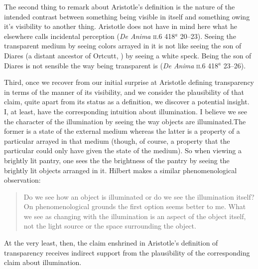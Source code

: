 \documentclass[12pt]{article}
\begin{document}
The second thing to remark about Aristotle's definition is the nature of the intended contrast between something being visible in itself and something owing it's visibility to another thing. Aristotle does not have in mind here what he elsewhere calls incidental perception (\emph{De Anima} \textsc{ii}.6 418\( ^{a} \) 20--23). Seeing the transparent medium by seeing colors arrayed in it is not like seeing the son of Diares (a distant ancestor of Ortcutt, \citealt{Quine:1956qp}) by seeing a white speck. Being the son of Diares is not sensible the way being transparent is (\emph{De Anima} \textsc{ii}.6 418\( ^{a} \) 23--26).

Third, once we recover from our initial surprise at Aristotle defining transparency in terms of the manner of its visibility, and we consider the plausibility of that claim, quite apart from its status as a definition, we discover a potential insight. I, at least, have the corresponding intuition about illumination. I believe we see the character of the illumination by seeing the way objects are illuminated.The former is a state of the external medium whereas the latter is a property of a particular arrayed in that medium (though, of course, a property that the particular could only have given the state of the medium). So when viewing a brightly lit pantry, one sees the the brightness of the pantry by seeing the brightly lit objects arranged in it.  Hilbert makes a similar phenomenological observation:
\begin{quote}
	Do we see how an object is illuminated or do we see the illumination itself? On phenomenological grounds the first option seems better to me. What we see as changing with the illumination is an aspect of the object itself, not the light source or the space surrounding the object. \citep[150--151]{Hilbert:2007qy}
\end{quote}
At the very least, then, the claim enshrined in Aristotle's definition of transparency receives indirect support from the plausibility of the corresponding claim about illumination.
\end{document}
